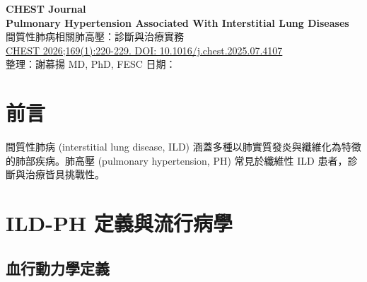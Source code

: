 \documentclass[11pt,a4paper]{article}
\begin{document}
\begin{center}
{\LARGE\bfseries\textcolor{emergency_red}{CHEST Journal}}\\[0.5cm]
{\Large\textbf{Pulmonary Hypertension Associated With Interstitial Lung Diseases}}\\[0.3cm]
{\large 間質性肺病相關肺高壓：診斷與治療實務}\\[0.5cm]
{\normalsize \href{https://doi.org/10.1016/j.chest.2025.07.4107}{CHEST 2026;169(1):220-229. DOI: 10.1016/j.chest.2025.07.4107}}\\[0.3cm]
{\normalsize 整理：謝慕揚 MD, PhD, FESC \quad 日期：\mydate}
\end{center}

\vspace{0.5cm}

\section{前言}

間質性肺病 (interstitial lung disease, ILD) 涵蓋多種以肺實質發炎與纖維化為特徵的肺部疾病。肺高壓 (pulmonary hypertension, PH) 常見於纖維性 ILD 患者，診斷與治療皆具挑戰性。


\section{ILD-PH 定義與流行病學}

\subsection{血行動力學定義}
\end{document}
